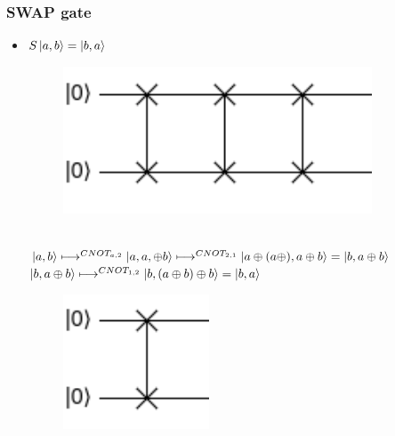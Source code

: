 \documentclass[11.5pt, paper=a4]{article}
\theoremstyle{definition}
\numberwithin{theorem}{section}
\begin{document}
\subsubsection{SWAP gate}
\begin{itemize}
    \item $S\ket{a,b} = \ket{b,a}$ \\
        \begin{figure}[h]
            \centering
            \includegraphics[scale=0.2]{SWAP 3.png}
        \end{figure}\\
        $\ket{a, b} \longmapsto^{CNOT_{a, 2}} \ket{a, a,\oplus b} \longmapsto^{CNOT_{2,1}} \ket{a \oplus (a \oplus), a \oplus b} = \ket{b, a \oplus b}$ \\
        $ \ket{b, a \oplus b} \longmapsto^{CNOT_{1,2}} \ket{b, (a \oplus b) \oplus b} = \ket{b, a}$ \\
         \begin{figure}[h]
            \centering
            \includegraphics[scale=0.2]{SWAP 1.png}
        \end{figure}\\
\end{itemize}
\end{document}
